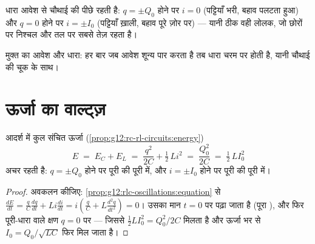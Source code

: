\begin{remark}[चौथाई आवर्तकाल की चूक]\label{rem:g12:rlc-oscillations:quarter}
धारा आवेश से चौथाई  की  पीछे रहती है: $q = \pm Q_0$ होने
पर $i = 0$ (पट्टियाँ भरी, बहाव पलटता हुआ) और $q = 0$ होने पर $i = \pm I_0$ (पट्टियाँ
ख़ाली, बहाव पूरे ज़ोर पर) --- यानी ठीक वही लोलक, जो छोरों पर निश्चल और तल पर
सबसे तेज़ रहता है।
\end{remark}

\begin{omfigure}

{\small मुक्त  का आवेश और धारा: हर बार जब आवेश शून्य पार करता
है तब धारा चरम पर होती है, यानी चौथाई  की चूक के साथ।}
\end{omfigure}

\section{ऊर्जा का वाल्ट्ज़}

\begin{proposition}[संचित ऊर्जा का संरक्षण]\label{prop:g12:rlc-oscillations:energy}
आदर्श  में कुल संचित ऊर्जा (\cref{prop:g12:rc-rl-circuits:energy})
\[
E \;=\; E_C + E_L \;=\; \frac{q^2}{2C} + \tfrac12\,L i^2
\;=\; \frac{Q_0^2}{2C} \;=\; \tfrac12\,L I_0^2
\]
अचर रहती है: $q = \pm Q_0$ होने पर पूरी की पूरी  में, और $i = \pm I_0$
होने पर पूरी की पूरी  में।
\end{proposition}

\begin{proof}
अवकलन कीजिए: \cref{prop:g12:rlc-oscillations:equation} से $\frac{dE}{dt} = \frac{q}{C}\frac{dq}{dt} +
Li\frac{di}{dt} = i\left(\frac{q}{C} + L\frac{d^2q}{dt^2}\right) = 0$। उसका मान $t = 0$ पर पढ़ा जाता है (पूरा
), और फिर पूरी-धारा वाले क्षण $q = 0$ पर --- जिससे $\tfrac12 L I_0^2 = Q_0^2/2C$
मिलता है और ऊर्जा भर से $I_0 = Q_0/\sqrt{LC}$ फिर मिल जाता है।
\end{proof}

